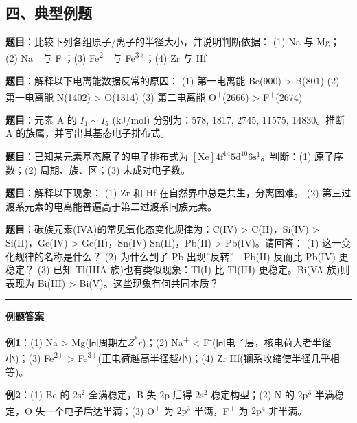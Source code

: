 \subsection{四、典型例题}\label{ux56dbux5178ux578bux4f8bux9898}

\textbf{题目}：比较下列各组原子/离子的半径大小，并说明判断依据：
(1) Na 与 Mg；(2) Na\textsuperscript{+} 与 F\textsuperscript{-}；(3) Fe\textsuperscript{2+} 与 Fe\textsuperscript{3+}；(4) Zr 与 Hf

\textbf{题目}：解释以下电离能数据反常的原因：
(1) 第一电离能 Be(900) \textgreater{} B(801)
(2) 第一电离能 N(1402) \textgreater{} O(1314)
(3) 第二电离能 O\textsuperscript{+}(2666) \textgreater{} F\textsuperscript{+}(2674)

\textbf{题目}：元素 A 的 \(I_1\sim I_5\) (kJ/mol) 分别为：578, 1817, 2745, 11575, 14830。推断 A 的族属，并写出其基态电子排布式。

\textbf{题目}：已知某元素基态原子的电子排布式为 \([\mathrm{Xe}] 4\mathrm{f}^{14} 5\mathrm{d}^{10} 6\mathrm{s}^1\)。判断：(1) 原子序数；(2) 周期、族、区；(3) 未成对电子数。

\textbf{题目}：解释以下现象：
(1) Zr 和 Hf 在自然界中总是共生，分离困难。
(2) 第三过渡系元素的电离能普遍高于第二过渡系同族元素。

\textbf{题目}：碳族元素(IVA)的常见氧化态变化规律为：C(IV) \textgreater{} C(II)，Si(IV) \textgreater{} Si(II)，Ge(IV) \textgreater{} Ge(II)，Sn(IV)  Sn(II)，Pb(II) \textgreater{} Pb(IV)。请回答：
(1) 这一变化规律的名称是什么？
(2) 为什么到了 Pb 出现''反转''---Pb(II) 反而比 Pb(IV) 更稳定？
(3) 已知 Tl(IIIA 族)也有类似现象：Tl(I) 比 Tl(III) 更稳定。Bi(VA 族)则表现为 Bi(III) \textgreater{} Bi(V)。这些现象有何共同本质？

\begin{center}\rule{0.5\linewidth}{0.5pt}\end{center}

\textbf{例题答案}

\textbf{例1}：(1) Na \textgreater{} Mg(同周期左 \(Z^*\) \(r\))；(2) Na\textsuperscript{+} \textless{} F\textsuperscript{-}(同电子层，核电荷大者半径小)；(3) Fe\textsuperscript{2+} \textgreater{} Fe\textsuperscript{3+}(正电荷越高半径越小)；(4) Zr  Hf(镧系收缩使半径几乎相等)。

\textbf{例2}：(1) Be 的 \(2\mathrm{s}^2\) 全满稳定，B 失 \(2\mathrm{p}\) 后得 \(2\mathrm{s}^2\) 稳定构型；(2) N 的 \(2\mathrm{p}^3\) 半满稳定，O 失一个电子后达半满；(3) O\textsuperscript{+} 为 \(2\mathrm{p}^3\) 半满，F\textsuperscript{+} 为 \(2\mathrm{p}^4\) 非半满。

